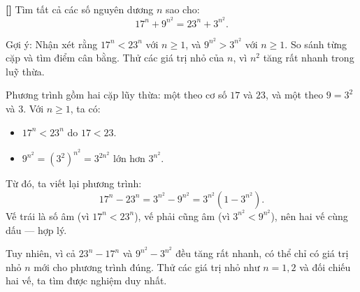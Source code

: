 \documentclass[../04-diophantine-equations.tex]{subfiles}
\begin{document}
\begin{exercise*}\label{example:ROU-2014-MO-G7-P3}\textbf{[]}
    Tìm tất cả các số nguyên dương \( n \) sao cho:
    \[
        17^n + 9^{n^2} = 23^n + 3^{n^2}.
    \]
\end{exercise*}

\begin{remark*}
    Gợi ý: Nhận xét rằng \( 17^n < 23^n \) với \( n \ge 1 \), và \( 9^{n^2} > 3^{n^2} \) với \( n \ge 1 \). So sánh từng cặp và tìm điểm cân bằng.  
    Thử các giá trị nhỏ của \( n \), vì \( n^2 \) tăng rất nhanh trong luỹ thừa.
\end{remark*}

\begin{story*}
    Phương trình gồm hai cặp lũy thừa: một theo cơ số \( 17 \) và \( 23 \), và một theo \( 9 = 3^2 \) và \( 3 \).  
    Với \( n \ge 1 \), ta có:
    \begin{itemize}[topsep=0pt, partopsep=0pt, itemsep=0pt]
        \item \( 17^n < 23^n \) do \( 17 < 23 \).
        \item \( 9^{n^2} = (3^2)^{n^2} = 3^{2n^2} \) lớn hơn \( 3^{n^2} \).
    \end{itemize}
    Từ đó, ta viết lại phương trình:
    \[
        17^n - 23^n = 3^{n^2} - 9^{n^2} = 3^{n^2}(1 - 3^{n^2}).
    \]
    Vế trái là số âm (vì \( 17^n < 23^n \)), vế phải cũng âm (vì \( 3^{n^2} < 9^{n^2} \)), nên hai vế cùng dấu — hợp lý.

    Tuy nhiên, vì cả \( 23^n - 17^n \) và \( 9^{n^2} - 3^{n^2} \) đều tăng rất nhanh, có thể chỉ có giá trị nhỏ \( n \) mới cho phương trình đúng.  
    Thử các giá trị nhỏ như \( n = 1, 2 \) và đối chiếu hai vế, ta tìm được nghiệm duy nhất.
\end{story*}
\end{document}
